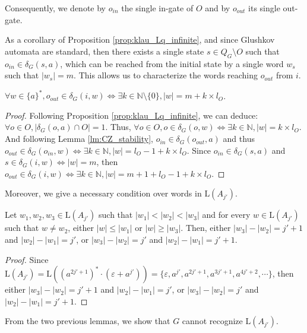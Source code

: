 \documentclass{llncs}
\begin{document}
	Consequently, we denote by $o_{in}$ the single in-gate of $O$ and by $o_{out}$ its single out-gate.

	As a corollary of Proposition \ref{prop:klau_Lq_infinite}, and since Glushkov automata are standard, then there exists a single state $s \in Q_G \setminus O$ such that $o_{in} \in \delta_G(s, a)$, which can be reached from the initial state by a single word $w_s$ such that $|w_s| = m$.
	This allows us to characterize the words reaching $o_{out}$ from $i$.

\begin{lemma}\label{lm:ooPathLength}
	$\forall w \in \{a\}^*, o_{out} \in \delta_G(i, w) \Longleftrightarrow \exists k \in \mathbb{N} \setminus \{0\}, |w| = m + k \times l_O$.
\end{lemma}
\begin{proof}
	Following Proposition \ref{prop:klau_Lq_infinite}, we can deduce: $\forall o \in O, |\delta_G(o, a) \cap O| = 1$.
	Thus, $\forall o \in O, o \in \delta_G(o, w) \Longleftrightarrow \exists k \in \mathbb{N}, |w| = k \times l_O$.
	And following Lemma \ref{lm:CZ_stability}, $o_{in} \in \delta_G(o_{out}, a)$ and thus $o_{out} \in \delta_G(o_{in}, w) \Longleftrightarrow \exists k \in \mathbb{N}, |w| = l_O - 1 + k \times l_O$.
	Since $o_{in} \in \delta_G(s, a)$ and $s \in \delta_G(i, w) \Longleftrightarrow |w| = m$, then $o_{out} \in \delta_G(i, w) \Longleftrightarrow \exists k \in \mathbb{N}, |w| = m + 1 + l_O - 1 + k \times l_O$.
\end{proof}

	Moreover, we give a necessary condition over words in $\mathrm{L}(A_{j'})$.

\begin{lemma}\label{lm:w123}
	Let $w_1, w_2, w_3 \in \mathrm{L}(A_{j'})$ such that $|w_1| < |w_2| < |w_3|$ and for every $w \in \mathrm{L}(A_{j'})$ such that $w \neq w_2$, either $|w| \leq |w_1|$ or $|w| \geq |w_3|$.
	Then, either $|w_3| - |w_2| = j'+1$ and $|w_2| - |w_1| = j'$, or $|w_3| - |w_2| = j'$ and $|w_2| - |w_1| = j' + 1$.
\end{lemma}
\begin{proof}
	Since $\mathrm{L}(A_{j'}) = \mathrm{L}((a^{2j'+1})^* \cdot (\varepsilon + a^{j'})) = \{\varepsilon, a^{j'}, a^{2j'+1}, a^{3j'+1}, a^{4j'+2}, \cdots \}$, then either $|w_3| - |w_2| = j'+1$ and $|w_2| - |w_1| = j'$, or $|w_3| - |w_2| = j'$ and $|w_2| - |w_1| = j' + 1$.
\end{proof}
	
	From the two previous lemmas, we show that $G$ cannot recognize $\mathrm{L}(A_{j'})$.
	
\end{document}
